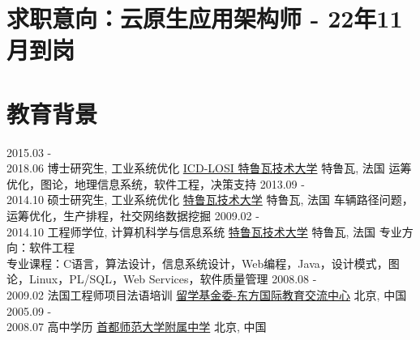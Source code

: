 \documentclass[letterpaper]{twentysecondcv} %
\begin{document}
\makeprofile %

\vspace{-0.2cm}
\section{求职意向：云原生应用架构师 - 22年11月到岗}

\vspace{-0.2cm}
\section{教育背景}

\begin{twenty}
	\twentyitem
    	{2015.03 - \\ 2018.06}
        {博士研究生, 工业系统优化}
        {\href{http://losi.utt.fr/en/index.html}{ICD-LOSI 特鲁瓦技术大学}}
        {特鲁瓦, 法国}
        {\textbullet{} 运筹优化，图论，地理信息系统，软件工程，决策支持}
	\twentyitem
    	{2013.09 - \\ 2014.10}
        {硕士研究生, 工业系统优化}
        {\href{http://www.utt.fr/en/index.html}{特鲁瓦技术大学}}
        {特鲁瓦, 法国}
        {\textbullet{} 车辆路径问题，运筹优化，生产排程，社交网络数据挖掘}
    \twentyitem
    	{2009.02 - \\ 2014.10}
        {工程师学位, 计算机科学与信息系统}
        {\href{http://www.utt.fr/en/index.html}{特鲁瓦技术大学}}
        {特鲁瓦, 法国}
        {\textbullet{} 专业方向：软件工程 \\
        \textbullet{} 专业课程：C语言，算法设计，信息系统设计，Web编程，Java，设计模式，图论，Linux，PL/SQL，Web Services，软件质量管理\vspace{0.3cm}}
    \twentyitem
        {2008.08 - \\ 2009.02}
        {法国工程师项目法语培训}
        {\href{http://www.cscdf.org/}{留学基金委-东方国际教育交流中心}}
        {北京, 中国}
        {\vspace{-0.3cm}}
    \twentyitem
        {2005.09 - \\ 2008.07}
        {高中学历}
        {\href{https://baike.baidu.com/item/首都师范大学附属中学}{首都师范大学附属中学}}
        {北京, 中国}
        {\vspace{-0.6cm}}
\end{twenty}
\end{document}
